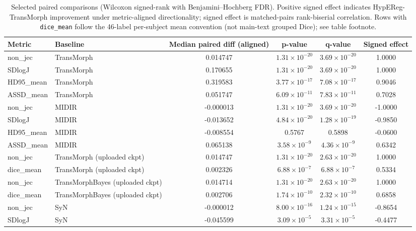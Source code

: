 \documentclass[11pt,a4paper]{article}
\begin{document}
\begin{table}[H]
\caption{Selected paired comparisons (Wilcoxon signed-rank with Benjamini--Hochberg FDR). Positive signed effect indicates HypEReg-TransMorph improvement under metric-aligned directionality; signed effect is matched-pairs rank-biserial correlation. Rows with \texttt{dice\_mean} follow the 46-label per-subject mean convention (not main-text grouped Dice); see table footnote.}
\scriptsize
\setlength{\tabcolsep}{3pt}
\begin{tabularx}{\textwidth}{llcccc}
\toprule
\textbf{Metric} & \textbf{Baseline} & \textbf{Median paired diff (aligned)} & \textbf{p-value} & \textbf{q-value} & \textbf{Signed effect}\\
\midrule
non\_jec & TransMorph & 0.014747 & \(1.31\times 10^{-20}\) & \(3.69\times 10^{-20}\) & 1.0000 \\
SDlogJ & TransMorph & 0.170655 & \(1.31\times 10^{-20}\) & \(3.69\times 10^{-20}\) & 1.0000 \\
HD95\_mean & TransMorph & 0.319583 & \(3.77\times 10^{-17}\) & \(7.08\times 10^{-17}\) & 0.9046 \\
ASSD\_mean & TransMorph & 0.051747 & \(6.09\times 10^{-11}\) & \(7.83\times 10^{-11}\) & 0.7028 \\
\midrule
non\_jec & MIDIR & -0.000013 & \(1.31\times 10^{-20}\) & \(3.69\times 10^{-20}\) & -1.0000 \\
SDlogJ & MIDIR & -0.013652 & \(4.84\times 10^{-20}\) & \(1.28\times 10^{-19}\) & -0.9850 \\
HD95\_mean & MIDIR & -0.008554 & 0.5767 & 0.5898 & -0.0600 \\
ASSD\_mean & MIDIR & 0.065138 & \(3.58\times 10^{-9}\) & \(4.36\times 10^{-9}\) & 0.6342 \\
\midrule
non\_jec & TransMorph (uploaded ckpt) & 0.014747 & \(1.31\times 10^{-20}\) & \(2.63\times 10^{-20}\) & 1.0000 \\
dice\_mean & TransMorph (uploaded ckpt) & 0.002326 & \(6.88\times 10^{-7}\) & \(6.88\times 10^{-7}\) & 0.5334 \\
non\_jec & TransMorphBayes (uploaded ckpt) & 0.014714 & \(1.31\times 10^{-20}\) & \(2.63\times 10^{-20}\) & 1.0000 \\
dice\_mean & TransMorphBayes (uploaded ckpt) & 0.002706 & \(1.74\times 10^{-10}\) & \(2.32\times 10^{-10}\) & 0.6858 \\
\midrule
non\_jec & SyN & -0.000012 & \(8.00\times 10^{-16}\) & \(1.24\times 10^{-15}\) & -0.8654 \\
SDlogJ & SyN & -0.045599 & \(3.09\times 10^{-5}\) & \(3.31\times 10^{-5}\) & -0.4477 \\

\end{tabularx}
\end{table}
\end{document}
